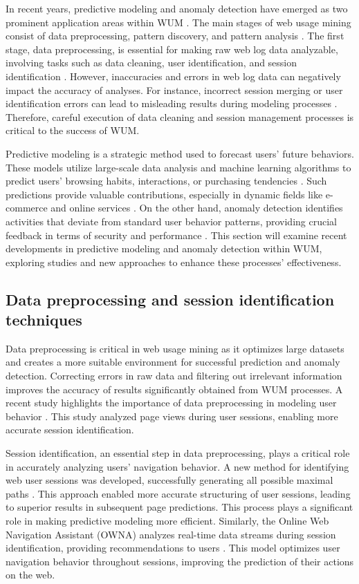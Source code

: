 In recent years, predictive modeling and anomaly detection have emerged as two prominent application areas within WUM \cite{Marcin2023, Hardik2023}. The main stages of web usage mining consist of data preprocessing, pattern discovery, and pattern analysis \cite{Suguna2017}. The first stage, data preprocessing, is essential for making raw web log data analyzable, involving tasks such as data cleaning, user identification, and session identification \cite{Panwar2018}. However, inaccuracies and errors in web log data can negatively impact the accuracy of analyses. For instance, incorrect session merging or user identification errors can lead to misleading results during modeling processes \cite{Sisodia2018}. Therefore, careful execution of data cleaning and session management processes is critical to the success of WUM.

Predictive modeling is a strategic method used to forecast users' future behaviors. These models utilize large-scale data analysis and machine learning algorithms to predict users' browsing habits, interactions, or purchasing tendencies \cite{Choudhary2023}. Such predictions provide valuable contributions, especially in dynamic fields like e-commerce and online services \cite{Ashraf2020}. On the other hand, anomaly detection identifies activities that deviate from standard user behavior patterns, providing crucial feedback in terms of security and performance \cite{Ilieva2021}. This section will examine recent developments in predictive modeling and anomaly detection within WUM, exploring studies and new approaches to enhance these processes' effectiveness.




\subsection{ Data preprocessing and session identification techniques}

Data preprocessing is critical in web usage mining as it optimizes large datasets and creates a more suitable environment for successful prediction and anomaly detection. Correcting errors in raw data and filtering out irrelevant information improves the accuracy of results significantly obtained from WUM processes. A recent study highlights the importance of data preprocessing in modeling user behavior \cite{Ali2020}. This study analyzed page views during user sessions, enabling more accurate session identification.

Session identification, an essential step in data preprocessing, plays a critical role in accurately analyzing users' navigation behavior. A new method for identifying web user sessions was developed, successfully generating all possible maximal paths \cite{Bayir2022}. This approach enabled more accurate structuring of user sessions, leading to superior results in subsequent page predictions. This process plays a significant role in making predictive modeling more efficient. Similarly, the Online Web Navigation Assistant (OWNA) analyzes real-time data streams during session identification, providing recommendations to users \cite{Ali2021}. This model optimizes user navigation behavior throughout sessions, improving the prediction of their actions on the web.


